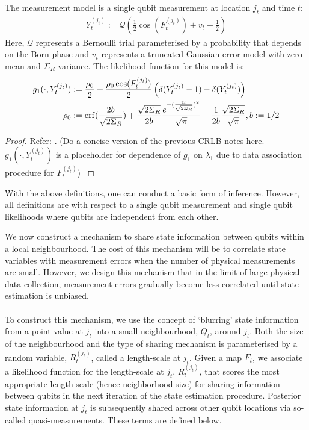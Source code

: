 \begin{proposition}
	The measurement model is a single qubit measurement at location $j_t$ and time $t$:
	\begin{align}
	Y_t^{(j_t)} := \mathcal{Q}(\frac{1}{2} \cos(F_t^{(j_t)}) + v_t + \frac{1}{2}) \label{qslam:measurementmodel}
	\end{align}
	Here, $\mathcal{Q}$ represents a Bernoulli trial parameterised by a probability that depends on the Born phase and $v_t$ represents a truncated Gaussian error model with zero mean and $\Sigma_R$ variance.	
	The likelihood function for this model is:
	\begin{align}
	 g_1(\cdot, Y_t^{(j_t)}) & :=  \frac{\rho_0}{2} + \frac{\rho_0  \cos(F_t^{(j_t)}) }{2} \left( \delta(Y_t^{(j_t)} - 1) - \delta(Y_t^{(j_t)}) \right) \label{qslam:likelihood:g1:func} \\
	\rho_0 &: =  \mathrm{erf}(\frac{2b}{\sqrt{2\Sigma_R}}) + \frac{\sqrt{2\Sigma_R}}{2b} \frac{e^{-(\frac{2b}{\sqrt{2\Sigma_R}})^2}}{\sqrt{\pi}}  - \frac{1}{2b}\frac{\sqrt{2\Sigma_R}}{\sqrt{\pi}}, b := 1/2 \label{qslam:likelihood:g1:rho0} 
	\end{align}
	\begin{proof}
	{\color{red} Refer: \cite{riddhinotes}. (Do a concise version of the previous CRLB notes here. $g_1(\cdot, Y_t^{(j_t)}) $ is a placeholder for dependence of $ g_1$  on $\lambda_1$ due to data association procedure for $F_t^{(j_t)}$) }
	\end{proof}
\end{proposition}	

With the above definitions, one can conduct a basic form of inference. However, all definitions are with respect to a single qubit measurement and single qubit likelihoods where qubits are independent from each other. 

We now construct a mechanism to share state information between qubits within a local neighbourhood. The cost of this mechanism will be to correlate state variables with measurement errors when the number of physical measurements are small. However, we design this mechanism that in the limit of large physical data collection, measurement errors gradually become less correlated until state estimation is unbiased.\\
\\
To construct this mechanism, we use the concept of `blurring' state information from a point value at $j_t$ into a small neighbourhood, $Q_t$, around $j_t$. Both the size of the neighbourhood and the type of sharing mechanism is parameterised by  a random variable, $R_t^{(j_t)}$, called a length-scale at $j_t$. Given a map $F_t$, we associate a likelihood function for the length-scale at $j_t$, $R_t^{(j_t)}$, that scores the most appropriate length-scale (hence neighborhood size) for sharing information between qubits in the next iteration of the state estimation procedure.  Posterior state information at $j_t$ is subsequently shared across other qubit locations via so-called quasi-measurements. These terms are defined below.


